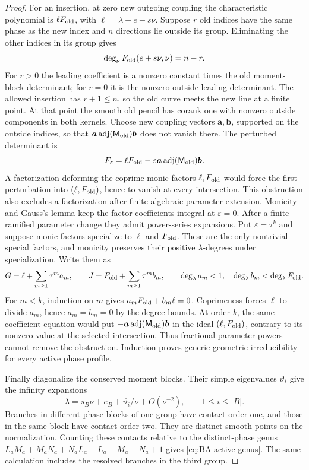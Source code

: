 \begin{proof}
For an insertion, at zero new outgoing coupling the characteristic
polynomial is $\ell F_{\rm old}$, with
$\ell=\lambda-e-s\nu$. Suppose $r$ old indices have the same phase
as the new index and $n$ directions lie outside its group. Eliminating
the other indices in its group gives
\[
 \deg_\nu F_{\rm old}(e+s\nu,\nu)=n-r.
\]
For $r>0$ the leading coefficient is a nonzero constant times the
old moment-block determinant; for $r=0$ it is the nonzero outside
leading determinant. The allowed insertion has $r+1\leq n$, so
the old curve meets the new line at a finite point. At that point
the smooth old pencil has corank one with nonzero outside components
in both kernels. Choose new coupling vectors $\boldsymbol a,\boldsymbol b$,
supported on the outside indices, so that
$\boldsymbol a\operatorname{adj}(\mathsf M_{\rm old})\boldsymbol b$ does not vanish there.
The perturbed determinant is
\[
 F_\varepsilon=\ell F_{\rm old}
       -\varepsilon \boldsymbol a\operatorname{adj}(\mathsf M_{\rm old})\boldsymbol b.
\]
A factorization deforming the coprime monic factors
$\ell,F_{\rm old}$ would force the first perturbation into
$(\ell,F_{\rm old})$, hence to vanish at every intersection.
This obstruction also excludes a factorization after finite algebraic
parameter extension. Monicity and Gauss's lemma keep the factor coefficients integral
at $\varepsilon=0$. After a finite ramified parameter change they
admit power-series expansions. Put $\varepsilon=\tau^k$ and suppose
monic factors specialize to $\ell$ and $F_{\rm old}$. These are the
only nontrivial special factors, and monicity preserves their positive
$\lambda$-degrees under specialization. Write them as
\[
 G=\ell+\sum_{m\geq1}\tau^m a_m,\qquad
 J=F_{\rm old}+\sum_{m\geq1}\tau^m b_m,
 \qquad \deg_\lambda a_m<1,\quad
        \deg_\lambda b_m<\deg_\lambda F_{\rm old}.
\]
For $m<k$, induction on $m$ gives
$a_mF_{\rm old}+b_m\ell=0$. Coprimeness forces $\ell$ to divide
$a_m$, hence $a_m=b_m=0$ by the degree bounds. At order $k$, the
same coefficient equation would put
$-\boldsymbol a\operatorname{adj}(\mathsf M_{\rm old})\boldsymbol b$
in the ideal $(\ell,F_{\rm old})$, contrary to its nonzero value at
the selected intersection. Thus fractional parameter powers cannot
remove the obstruction. Induction proves generic geometric
irreducibility for every active phase profile.

Finally diagonalize the conserved moment blocks. Their simple
eigenvalues $\vartheta_i$ give the infinity expansions
\[
 \lambda=s_B\nu+e_B+\vartheta_i/\nu+O(\nu^{-2}),
 \qquad1\leq i\leq |B|.
\]
Branches in different phase blocks of one group have contact order
one, and those in the same block have contact order two. They are
distinct smooth points on the normalization. Counting these contacts
relative to the distinct-phase genus $L_aM_a+M_aN_a+N_aL_a-L_a-M_a-N_a+1$ gives
\cref{eq:BA-active-genus}. The same calculation includes the resolved branches in the third group.


\end{proof}
